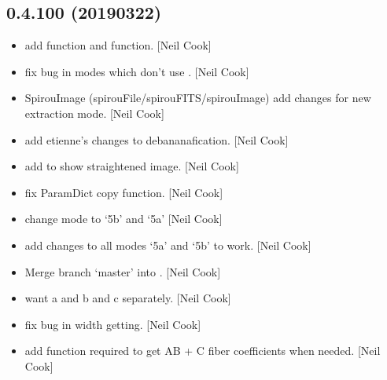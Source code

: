 \documentclass[a4paper,10pt,english]{report}
\begin{document}
\subsection{0.4.100 (2019\sphinxhyphen{}03\sphinxhyphen{}22)}
\label{\detokenize{misc/changelog:id178}}\begin{itemize}
\item {} 
 \sphinxhyphen{} add  function and
 function. {[}Neil Cook{]}

\item {} 
 \sphinxhyphen{} fix bug in modes which don’t use . {[}Neil Cook{]}

\item {} 
SpirouImage (spirouFile/spirouFITS/spirouImage) \sphinxhyphen{} add changes for new
extraction mode. {[}Neil Cook{]}

\item {} 
 \sphinxhyphen{} add etienne’s changes to debananafication. {[}Neil
Cook{]}

\item {} 
 \sphinxhyphen{} add  to show straightened image.
{[}Neil Cook{]}

\item {} 
 \sphinxhyphen{} fix ParamDict copy function. {[}Neil Cook{]}

\item {} 
 \sphinxhyphen{} change mode to ‘5b’ and ‘5a’ {[}Neil Cook{]}

\item {} 
 \sphinxhyphen{} add changes to all modes ‘5a’ and ‘5b’ to
work. {[}Neil Cook{]}

\item {} 
Merge branch ‘master’ into . {[}Neil Cook{]}

\item {} 
 \sphinxhyphen{} want a and b and c separately. {[}Neil Cook{]}

\item {} 
 \sphinxhyphen{} fix bug in width getting. {[}Neil Cook{]}

\item {} 
 \sphinxhyphen{} add function required to get AB + C fiber
coefficients when needed. {[}Neil Cook{]}


\end{itemize}
\end{document}
